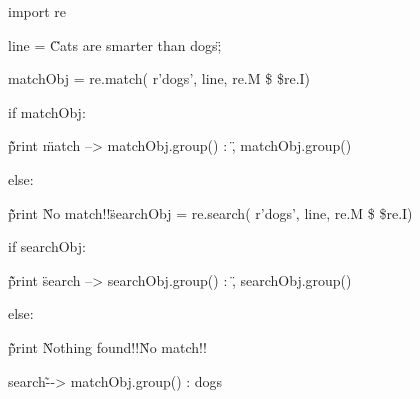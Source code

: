 \begin {enumerate}
\begin {enumerate}
import re

line = \"Cats are smarter than dogs\";

matchObj = re.match( r'dogs', line, re.M \$   \$re.I)

if matchObj:

\~\~ print \"match --> matchObj.group() : \", matchObj.group()

else:

\~\~ print \"No match!!\"

searchObj = re.search( r'dogs', line, re.M \$    \$re.I)

if searchObj:

\~\~ print \"search --> searchObj.group() : \", searchObj.group()

else:

\~\~ print \"Nothing found!!\"

No match!!

search\~--> matchObj.group() :  dogs


\end{enumerate}
\end{enumerate}
